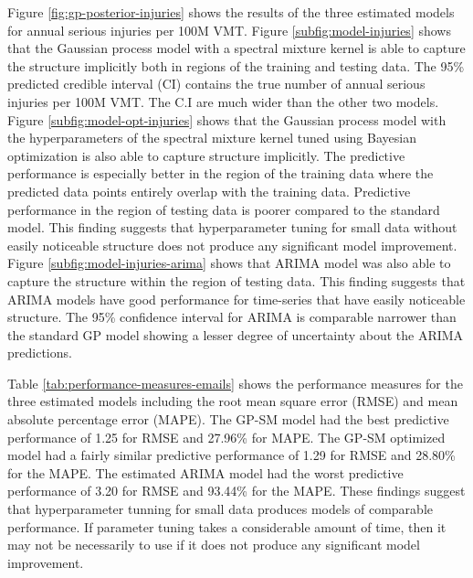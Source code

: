 \documentclass[letterpaper]{article}
\begin{document}
Figure \ref{fig:gp-posterior-injuries} shows the results of the three estimated models for annual serious injuries per 100M VMT. Figure \ref{subfig:model-injuries} shows that the Gaussian process model with a spectral mixture kernel is able to capture the structure implicitly both in regions of the training and testing data. The 95\% predicted credible interval (CI) contains the true number of annual serious injuries per 100M VMT. The C.I are much wider than the other two models. Figure \ref{subfig:model-opt-injuries} shows that the Gaussian process model with the hyperparameters of the spectral mixture kernel tuned using Bayesian optimization is also able to capture structure implicitly. The predictive performance is especially better in the region of the training data where the predicted data points entirely overlap with the training data. Predictive performance in the region of testing data is poorer compared to the standard model. This finding suggests that hyperparameter tuning for small data without easily noticeable structure does not produce any significant model improvement. Figure \ref{subfig:model-injuries-arima} shows that ARIMA model was also able to capture the structure within the region of testing data. This finding suggests that ARIMA models have good performance for time-series that have easily noticeable structure. The 95\% confidence interval for ARIMA is comparable narrower than the standard GP model showing a lesser degree of uncertainty about the ARIMA predictions.

Table \ref{tab:performance-measures-emails} shows the performance measures for the three estimated models including the root mean square error (RMSE) and mean absolute percentage error (MAPE). The GP-SM model had the best predictive performance of 1.25 for RMSE and 27.96\% for MAPE. The GP-SM optimized model had a fairly similar predictive performance of 1.29 for RMSE and 28.80\% for the MAPE. The estimated ARIMA model had the worst predictive performance of 3.20 for RMSE and 93.44\% for the MAPE. These findings suggest that hyperparameter tunning for small data produces models of comparable performance. If parameter tuning takes a considerable amount of time, then it may not be necessarily to use if it does not produce any significant model improvement.
\end{document}
